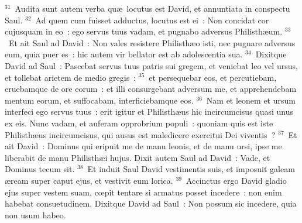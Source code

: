 ${}^{31}$~Audita sunt autem verba qu\ae\ locutus est David, et annuntiata in conspectu Saul.
${}^{32}$~Ad quem cum fuisset adductus, locutus est ei~: Non concidat cor cujusquam in eo~: ego servus tuus vadam, et pugnabo adversus Philisth\ae um.
${}^{33}$~Et ait Saul ad David~: Non vales resistere Philisth\ae o isti, nec pugnare adversus eum, quia puer es~: hic autem vir bellator est ab adolescentia sua.
${}^{34}$~Dixitque David ad Saul~: Pascebat servus tuus patris sui gregem, et veniebat leo vel ursus, et tollebat arietem de medio gregis~:
${}^{35}$~et persequebar eos, et percutiebam, eruebamque de ore eorum~: et illi consurgebant adversum me, et apprehendebam mentum eorum, et suffocabam, interficiebamque eos.
${}^{36}$~Nam et leonem et ursum interfeci ego servus tuus~: erit igitur et Philisth\ae us hic incircumcisus quasi unus ex eis. Nunc vadam, et auferam opprobrium populi~: quoniam quis est iste Philisth\ae us incircumcisus, qui ausus est maledicere exercitui Dei viventis~?
${}^{37}$~Et ait David~: Dominus qui eripuit me de manu leonis, et de manu ursi, ipse me liberabit de manu Philisth\ae i hujus. Dixit autem Saul ad David~: Vade, et Dominus tecum sit.
${}^{38}$~Et induit Saul David vestimentis suis, et imposuit galeam \ae ream super caput ejus, et vestivit eum lorica.
${}^{39}$~Accinctus ergo David gladio ejus super vestem suam, cœpit tentare si armatus posset incedere~: non enim habebat consuetudinem. Dixitque David ad Saul~: Non possum sic incedere, quia non usum habeo.


